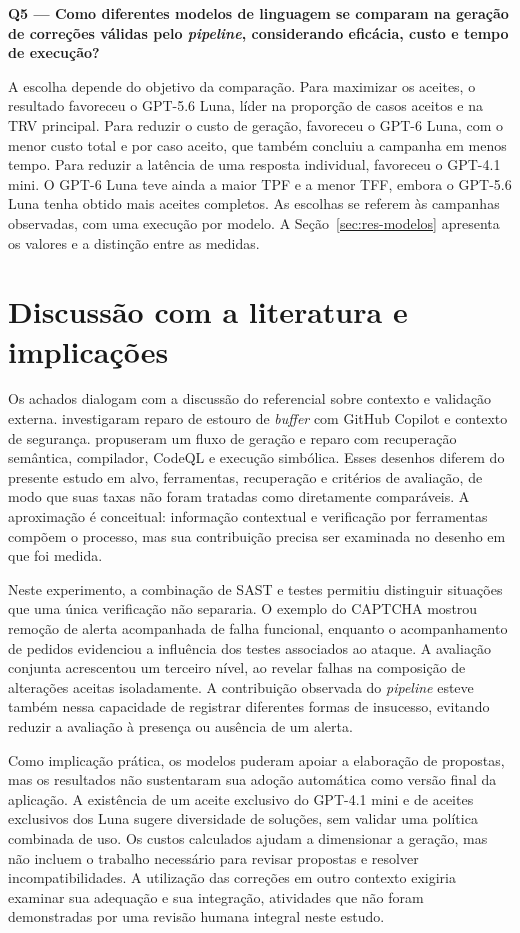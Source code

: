 \textbf{Q5 --- Como diferentes modelos de linguagem se comparam na geração de correções válidas pelo \textit{pipeline}, considerando eficácia, custo e tempo de execução?}

A escolha depende do objetivo da comparação. Para maximizar os aceites, o resultado favoreceu o GPT-5.6 Luna, líder na proporção de casos aceitos e na TRV principal. Para reduzir o custo de geração, favoreceu o GPT-6 Luna, com o menor custo total e por caso aceito, que também concluiu a campanha em menos tempo. Para reduzir a latência de uma resposta individual, favoreceu o GPT-4.1 mini. O GPT-6 Luna teve ainda a maior TPF e a menor TFF, embora o GPT-5.6 Luna tenha obtido mais aceites completos. As escolhas se referem às campanhas observadas, com uma execução por modelo. A Seção~\ref{sec:res-modelos} apresenta os valores e a distinção entre as medidas.

\section{Discussão com a literatura e implicações}
\label{sec:res-literatura}

Os achados dialogam com a discussão do referencial sobre contexto e validação externa.  investigaram reparo de estouro de \textit{buffer} com GitHub Copilot e contexto de segurança.  propuseram um fluxo de geração e reparo com recuperação semântica, compilador, CodeQL e execução simbólica. Esses desenhos diferem do presente estudo em alvo, ferramentas, recuperação e critérios de avaliação, de modo que suas taxas não foram tratadas como diretamente comparáveis. A aproximação é conceitual: informação contextual e verificação por ferramentas compõem o processo, mas sua contribuição precisa ser examinada no desenho em que foi medida.

Neste experimento, a combinação de SAST e testes permitiu distinguir situações que uma única verificação não separaria. O exemplo do CAPTCHA mostrou remoção de alerta acompanhada de falha funcional, enquanto o acompanhamento de pedidos evidenciou a influência dos testes associados ao ataque. A avaliação conjunta acrescentou um terceiro nível, ao revelar falhas na composição de alterações aceitas isoladamente. A contribuição observada do \textit{pipeline} esteve também nessa capacidade de registrar diferentes formas de insucesso, evitando reduzir a avaliação à presença ou ausência de um alerta.

Como implicação prática, os modelos puderam apoiar a elaboração de propostas, mas os resultados não sustentaram sua adoção automática como versão final da aplicação. A existência de um aceite exclusivo do GPT-4.1 mini e de aceites exclusivos dos Luna sugere diversidade de soluções, sem validar uma política combinada de uso. Os custos calculados ajudam a dimensionar a geração, mas não incluem o trabalho necessário para revisar propostas e resolver incompatibilidades. A utilização das correções em outro contexto exigiria examinar sua adequação e sua integração, atividades que não foram demonstradas por uma revisão humana integral neste estudo.

